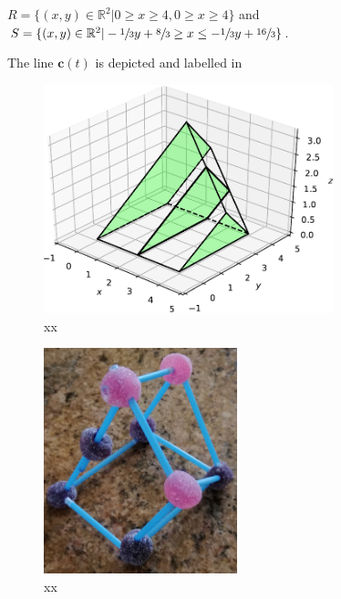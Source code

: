 \documentclass{article}
\theoremstyle{theorem}
\theoremstyle{definition}
\begin{document}
$R = \{(x,y)\in\mathbb{R}^2|0 \geq x \geq 4, 0 \geq x \geq 4\}$
and $S = \{(x,y)\in\mathbb{R}^2|-\sfrac{1}{3}y+\sfrac{8}{3}\geq x\leq -\sfrac{1}{3}y+\sfrac{16}{3} \}$.



The line $\mathbf{c}(t)$  is depicted and labelled in 


\begin{figure}[htb]
\centering
\includegraphics[width=0.75\textwidth]{prismatoid.pdf}
\caption{xx}
\label{fig:prismatoid}
\end{figure}

\begin{figure}[htb]
\centering
\includegraphics[width=0.5\textwidth]{prismatoid_real.jpg}
\caption{xx}
\label{fig:prismatoid_real}
\end{figure}
\end{document}
